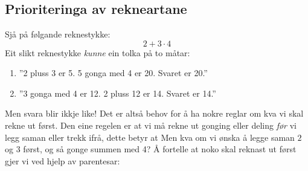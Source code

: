 



\section{\rrek}
\subsection*{Prioriteringa av rekneartane}
Sjå på følgande reknestykke:
\[ 2+3\cdot4 \]
Eit slikt reknestykke \textsl{kunne} ein tolka på to måtar:
\begin{enumerate}
	\item ''2 pluss 3 er 5. 5 gonga med 4 er 20. Svaret er 20.''
	\item ''3 gonga med 4 er 12. 2 pluss 12 er 14. Svaret er 14.''
\end{enumerate}
Men svara blir ikkje like! Det er altså behov for å ha nokre reglar om kva vi skal rekne ut først. Den eine regelen er at vi må rekne ut gonging eller deling \textsl{før} vi legg saman eller trekk ifrå, dette betyr at \regv
\st{ \vs
{}
}
Men kva om vi ønska å legge saman $ 2 $ og $ 3 $ først, og så gonge summen med 4? Å fortelle at noko skal reknast ut først gjer vi ved hjelp av parentesar: \regv
\st{\vs
{}
}\regv

\newpage
{}
